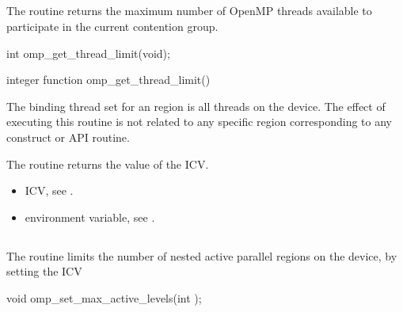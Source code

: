 \subsection{}
\label{subsec:omp_get_thread_limit}
\summary
The  routine returns the maximum number of OpenMP 
threads available to participate in the current contention group. 

\format
\ccppspecificstart
\begin{boxedcode}
int omp\_get\_thread\_limit(void);
\end{boxedcode}
\ccppspecificend

\fortranspecificstart
\begin{boxedcode}
integer function omp\_get\_thread\_limit()
\end{boxedcode}
\fortranspecificend

\binding
The binding thread set for an  region is all threads on the 
device. The effect of executing this routine is not related to any specific region 
corresponding to any construct or API routine. 

\effect
The  routine returns the value of the  ICV.

\crossreferences
\begin{itemize}
\item {} ICV, see 
.

\item {} environment variable, see 
.
\end{itemize}









\subsection{}
\label{subsec:omp_set_max_active_levels}
\summary
The  routine limits the number of nested active 
parallel regions on the device, by setting the  ICV

\format
\ccppspecificstart
\begin{boxedcode}
void omp\_set\_max\_active\_levels(int );
\end{boxedcode}
\ccppspecificend

